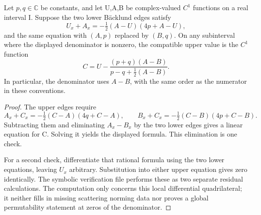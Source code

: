 \begin{proposition}\oursComputed
Let \(p,q\in\mathbb C\) be constants, and let U,A,B be
complex-valued \(C^1\) functions on a real interval I. Suppose the
two lower B\"acklund edges satisfy
\[
 U_x+A_x=-\tfrac12(A-U)(4p+A-U),
\]
and the same equation with \((A,p)\) replaced by \((B,q)\).
On any subinterval where the displayed denominator is nonzero,
the compatible upper value is the \(C^1\) function
\[
 C=U-\frac{(p+q)(A-B)}{p-q+\tfrac12(A-B)}.
\]
In particular, the denominator uses \(A-B\), with the same order
as the numerator in these conventions.
\end{proposition}
\begin{proof}
The upper edges require
\[
 A_x+C_x=-\tfrac12(C-A)(4q+C-A),\qquad
 B_x+C_x=-\tfrac12(C-B)(4p+C-B).
\]
Subtracting them and eliminating \(A_x-B_x\) by the two lower
edges gives a linear equation for C. Solving it yields the displayed
formula. This elimination is one check.

For a second check, differentiate that rational formula using the two
lower equations, leaving \(U_x\) arbitrary. Substitution into either
upper equation gives zero identically. The symbolic verification file
performs these as two separate residual calculations. The computation
only concerns this local differential quadrilateral; it neither fills
in missing scattering norming data nor proves a global permutability
statement at zeros of the denominator.
\end{proof}


